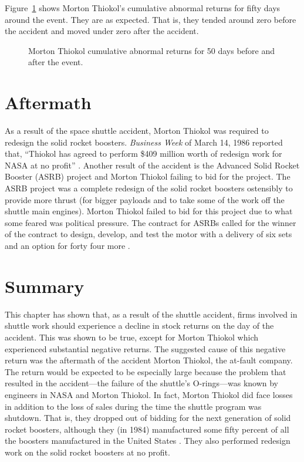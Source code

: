 Figure~\ref{thcar} shows Morton Thiokol's cumulative abnormal returns for fifty days around the event. They are as expected. That is, they tended around zero before the accident and moved under zero after the accident.

\begin{figure}[hp]
\begin{center}

\end{center}
\caption{Morton Thiokol cumulative abnormal returns for 50
days before and after the event.}
\label{thcar}
\end{figure}
\clearpage



\section{Aftermath}

As a result of the space shuttle accident, Morton Thiokol was required to redesign the solid rocket boosters. {\em Business Week} of March 14, 1986 reported that, ``Thiokol has agreed to perform \$409 million worth of redesign work for NASA at no profit'' \cite[p. 91]{bw}. Another result of the accident is the Advanced Solid Rocket Booster (ASRB) project and Morton Thiokol failing to bid for the project. The ASRB project was a complete redesign of the solid rocket boosters ostensibly to provide more thrust (for bigger payloads and to take some of the work off the shuttle main engines). Morton Thiokol failed to bid for this project due to what some feared was political pressure. The contract for ASRBs called for the winner of the contract to design, develop, and test the motor with a delivery of six sets and an option for forty four more \cite[p. 13]{gao89}.

\section{Summary}

This chapter has shown that, as a result of the shuttle accident, firms involved in shuttle work should experience a decline in stock returns on the day of the accident. This was shown to be true, except for Morton Thiokol which experienced substantial negative returns. The suggested cause of this negative return was the aftermath of the accident Morton Thiokol, the at-fault company. The return would be expected to be especially large because the problem that resulted in the accident---the failure of the shuttle's O-rings---was known by engineers in NASA and Morton Thiokol. In fact, Morton Thiokol did face losses in addition to the loss of sales during the time the shuttle program was shutdown. That is, they dropped out of bidding for the next generation of solid rocket boosters, although they (in 1984) manufactured some fifty percent of all the boosters manufactured in the United States \cite[p. 18]{gao86}. They also performed redesign work on the solid rocket boosters at no profit.

